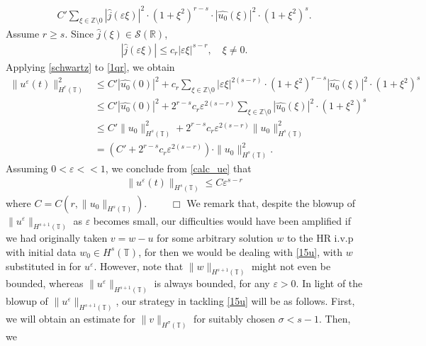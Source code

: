 \documentclass[12pt,reqno]{amsart}
\newcommand{\rr}{\mathbb{R}}
\newcommand{\zz}{\mathbb{Z}}
\newcommand{\ci}{\mathbb{T}}
\newcommand{\ee}{\varepsilon}
\theoremstyle{plain}  %
\theoremstyle{definition}
\begin{document}
\begin{appendices}
\begin{equation}
\begin{split}
		C' \sum_{\xi \in \zz \setminus {0}} |\widehat{j }(\ee \xi)|^2 \cdot (1 +
		\xi^2)^{r-s} \cdot |\widehat{u_0}(\xi)|^2 \cdot (1 + \xi^2)^s.
		\label{1qr}
	\end{split}
\end{equation}
Assume $r \ge s$. Since $\widehat{j }(\xi) \in \mathcal{S}(\rr)$, 
\begin{equation}
	\label{schwartz}
	\begin{split}
		|\widehat{j }(\ee \xi)| \le c_r |\ee \xi |^{s-r}, \quad \xi \neq 0.
	\end{split}
\end{equation}
Applying \eqref{schwartz} to \eqref{1qr}, we obtain
\begin{equation}
	\label{calc_ue}
	\begin{split}
		\|u^\ee (t)\|_{H^r(\ci)}^2 
		& \le C' |\widehat{u_0}(0) |^2 + c_r \sum_{\xi \in \zz \setminus
		{0}} |\ee \xi |^{2(s-r)} \cdot (1 + \xi^2)^{r-s}
		|\widehat{u_0}(\xi) |^2 \cdot (1 + \xi^2)^s
		\\
		& \le C' |\widehat{u_0}(0) |^2 + 2^{r-s} c_r \ee^{2(s-r)}
		\sum_{\xi \in \zz \setminus {0}} |\widehat{u_0}(\xi)|^2 \cdot (1 +
		\xi^2)^s
		\\
		& \le C' \|u_0\|_{H^s(\ci)}^2 + 2^{r-s} c_r \ee^{2(s-r)}
		\|u_0\|_{H^s(\ci)}^2
		\\
		& = (C' + 2^{r-s} c_r \ee^{2(s-r)}) \cdot \|u_0\|^2_{H^s(\ci)}.
	\end{split}
\end{equation}
Assuming $0 < \ee <<1$, we conclude from \eqref{calc_ue} that 
\begin{equation*}
	\begin{split}
		\|u^\ee(t)\|_{H^s(\ci)} \le C \ee^{s-r}
	\end{split}
\end{equation*}
where $C = C(r, \|u_0\|_{H^s(\ci)})$. $\qquad \Box$
\vskip0.1in
	We remark that, despite the blowup of $\|u^\ee \|_{H^{s+1}(\ci)}$
	as $\ee$ becomes small, our difficulties would have been
	amplified if we had originally taken $v=w-u$ for some arbitrary
	solution $w$ to the HR
	i.v.p with initial data $w_0 \in H^s(\ci)$, for then we would be dealing with
	\eqref{15u}, with $w$ substituted in for $u^\ee$. However, note that 
	$\|w\|_{H^{s+1}(\ci)}$ might not even be bounded, whereas $\|u^\ee
	\|_{H^{s+1}(\ci)}$ is always bounded, for any $\ee > 0$.
	\vskip0.1in
	In light of the blowup of $\|u^\ee \|_{H^{s+1}(\ci)}$,
	our strategy in tackling
	\eqref{15u} will be as follows. First, we will obtain an estimate for
	$\|v\|_{H^\sigma(\ci)}$ for suitably chosen $\sigma < s-1$. Then, we

\end{appendices}
\end{document}
